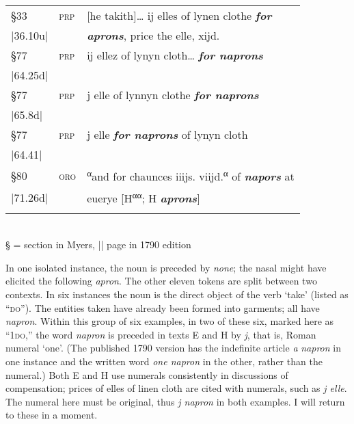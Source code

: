 \documentclass[output=paper,
modfonts
]{LSP/langsci}
\begin{document}
\begin{table}[ht]
\begin{tabular}{lll}
§33 &	\textsc{prp}	&	{[}he takith{]}\ldots{} ij elles of lynen clothe \emph{\textbf{for}}  \\
|36.10u| & & \emph{\textbf{aprons}}, price the elle, xijd. \\

§77 &	\textsc{prp}	&	ij ellez of lynyn cloth\ldots{} \textbf{\emph{for naprons}} \\
|64.25d| & & \\

§77 &	\textsc{prp}	&	 j elle of lynnyn clothe \emph{\textbf{for naprons}}	\\
|65.8d| & & \\

§77 &	\textsc{prp}	&	j elle \emph{\textbf{for naprons}} of lynyn cloth \\
|64.41| & & \\

§80 &	\textsc{oro}	&	\textsuperscript{α}and for chaunces iiijs. viijd.\textsuperscript{α} of \emph{\textbf{napors}} at \\
|71.26d| & &  euerye {[}H\textsuperscript{αα}; H \emph{\textbf{aprons}}{]} \\
\lspbottomrule
\end{tabular}
\\
§ = section in Myers, || page in 1790 edition
\end{table}

In one isolated instance, the noun is preceded by \emph{none}; the nasal
might have elicited the following \emph{apron}. The other eleven tokens
are split between two contexts. In six instances the noun is the direct
object of the verb `take' (listed as ``\textsc{do}''). The entities
taken have already been formed into garments; all have \emph{napron}.
Within this group of six examples, in two of these six, marked here as
``1\textsc{do},'' the word \emph{napron} is preceded in texts E and H by
\emph{j}, that is, Roman numeral `one'. (The published 1790 version has
the indefinite article \emph{a} \emph{napron} in one instance and the
written word \emph{one napron} in the other, rather than the numeral.)
Both E and H use numerals consistently in discussions of compensation;
prices of elles of linen cloth are cited with numerals, such as \emph{j
elle}. The numeral here must be original, thus \emph{j napron} in both
examples. I will return to these in a moment.
\end{document}
